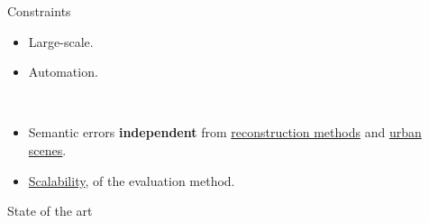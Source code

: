 \documentclass[10pt]{beamer}
\begin{document}
        \begin{frame}{Constraints}
            \begin{itemize}
                \item<1-> Large-scale.
                \item<2-> Automation.
            \end{itemize}
            ~\\
            \begin{itemize}
                \item<1-> Semantic errors \textbf{independent} from \underline{reconstruction methods} and \underline{urban scenes}.
                \item<2-> \underline{Scalability}, of the evaluation method.
            \end{itemize}
        \end{frame}

        \begin{frame}{State of the art}
            \centering
            
        \end{frame}
\end{document}
